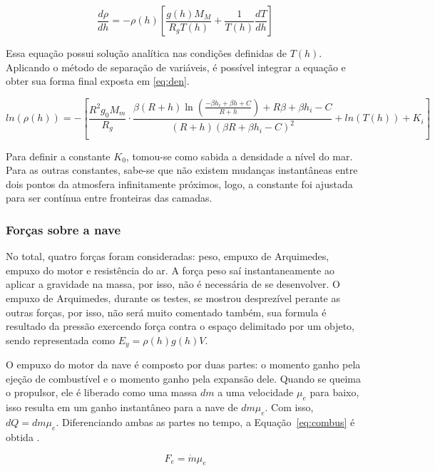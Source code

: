 \begin{equation}
  \frac{d\rho}{dh}=-\rho(h)[\frac{g(h)M_M}{R_g T(h)}+\frac{1}{T(h)}\frac{dT}{dh}]
  \label{eq:dif_den}
\end{equation}

Essa equação possui solução analítica nas condições definidas de \(T(h)\). Aplicando o método de separação de variáveis, é possível integrar a equação e obter sua forma final exposta em \eqref{eq:den}.

\begin{equation}
  ln(\rho(h)) = -[
  \frac{R^2 g_0 M_m}{R_g}
  \cdot
  \frac{
  \beta(R+h)\ln\left(
  \frac{-\beta h_i+\beta h+C}{R+h}
  \right)
  +R\beta+\beta h_i-C
  }{
  (R+h)\left(\beta R+\beta h_i-C\right)^2
  }
  + ln(T(h)) + K_i]
  \label{eq:den}
\end{equation}

Para definir a constante \(K_0\), tomou-se como sabida a densidade a nível do mar. Para as outras constantes, sabe-se que não existem mudanças instantâneas entre dois pontos da atmosfera infinitamente próximos, logo, a constante foi ajustada para ser contínua entre fronteiras das camadas.

\subsubsection{Forças sobre a nave}

No total, quatro forças foram consideradas: peso, empuxo de Arquimedes, empuxo do motor e resistência do ar. A força peso saí instantaneamente ao aplicar a gravidade na massa, por isso, não é necessária de se desenvolver. O empuxo de Arquimedes, durante os testes, se mostrou desprezível perante as outras forças, por isso, não será muito comentado também, sua formula é resultado da pressão exercendo força contra o espaço delimitado por um objeto, sendo representada como \(E_y=\rho(h)g(h)V\).

O empuxo do motor da nave é composto por duas partes: o momento ganho pela ejeção de combustível e o momento ganho pela expansão dele. Quando se queima o propulsor, ele é liberado como uma massa \(dm\) a uma velocidade \(\mu_e\) para baixo, isso resulta em um ganho instantâneo para a nave de \(dm\mu_e\). Com isso, \(dQ=dm\mu_e\). Diferenciando ambas as partes no tempo, a Equação~\eqref{eq:combus} é obtida \cite{NASAIdealRocketEquation}.

\begin{equation}
  F_e = \dot{m}\mu_e
  \label{eq:combus}
\end{equation}

